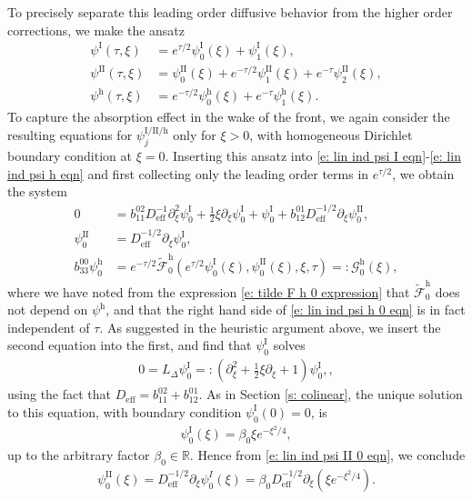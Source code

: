 \documentclass[11pt]{article}
\newcommand{\R}{\mathbb{R}}
\numberwithin{equation}{section}
\numberwithin{prop}{section}
\newcommand{\psih}{\psi^\mathrm{h}}
\newcommand{\Deff}{D_\mathrm{eff}}
\newcommand{\Gh}{\mathcal{G}^\mathrm{h}}
\newcommand{\tfh}{\tilde{\mathcal{F}}^\mathrm{h}}
\newcommand{\psiI}{\psi^\mathrm{I}}
\newcommand{\psiII}{\psi^\mathrm{II}}
\begin{document}
To precisely separate this leading order diffusive behavior from the higher order corrections, we make the ansatz
\begin{align}
\psiI (\tau, \xi) &= e^{\tau/2} \psiI_0 (\xi) + \psiI_1 (\xi), \label{e: lin ind psiI ansatz}\\
\psiII(\tau, \xi) &= \psiII_0(\xi) + e^{-\tau/2} \psiII_1 (\xi) + e^{-\tau} \psiII_2 (\xi), \label{e: lin ind psiII ansatz} \\
\psih(\tau, \xi) &= e^{-\tau/2} \psih_0 (\xi) + e^{-\tau} \psih_1 (\xi). \label{e: lin ind psih ansatz}
\end{align}
To capture the absorption effect in the wake of the front, we again consider the resulting equations for $\psi^{\mathrm{I}/\mathrm{II}/\mathrm{h}}_j$ only for $\xi > 0$, with homogeneous Dirichlet boundary condition at $\xi = 0$. Inserting this ansatz into \eqref{e: lin ind psi I eqn}-\eqref{e: lin ind psi h eqn} and first collecting only the leading order terms in $e^{\tau/2}$, we obtain the system
\begin{align}
0 &= b_{11}^{02} \Deff^{-1} \partial_\xi^2  \psiI_0 + \frac{1}{2} \xi \partial_\xi \psiI_0 + \psiI_0 + b_{12}^{01} \Deff^{-1/2} \partial_\xi  \psiII_0, \\
\psiII_0 &= \Deff^{-1/2} \partial_\xi  \psiI_0, \label{e: lin ind psi II 0 eqn}\\
b_{33}^{00} \psih_0 &= e^{-\tau/2} \tfh_0 (e^{\tau/2} \psiI_0 (\xi), \psiII_0 (\xi), \xi, \tau) =: \Gh_0(\xi), \label{e: lin ind psi h 0 eqn}
\end{align}
where we have noted from the expression \eqref{e: tilde F h 0 expression} that $\tfh_0$ does not depend on $\psih$, and that the right hand side of \eqref{e: lin ind psi h 0 eqn} is in fact independent of $\tau$. As suggested in the heuristic argument above, we insert the second equation into the first, and find that $\psiI_0$ solves
\begin{align}
0 = L_\Delta \psiI_0 =: \left(\partial_\xi^2 + \frac{1}{2} \xi \partial_\xi + 1 \right) \psiI_0, \label{e: lin ind psiI0 eqn},
\end{align}
using the fact that $\Deff = b_{11}^{02} + b_{12}^{01}$. As in Section \ref{s: colinear}, the unique solution to this equation, with boundary condition $\psiI_0(0) = 0$, is
\begin{align}
\psiI_0 (\xi) = \beta_0 \xi e^{-\xi^2/4},
\end{align}
up to the arbitrary factor $\beta_0 \in \R$. 
Hence from \eqref{e: lin ind psi II 0 eqn}, we conclude 
\begin{align}
\psiII_0(\xi) = \Deff^{-1/2} \partial_\xi \psi^I_0 (\xi) = \beta_0 \Deff^{-1/2} \partial_\xi \left( \xi e^{-\xi^2/4} \right). \label{e: lin ind psi II 0 expression}
\end{align}
\end{document}

